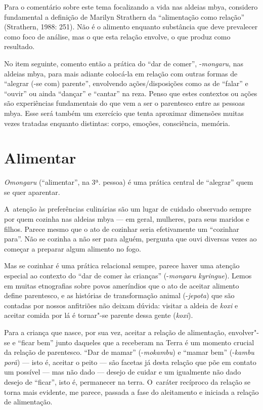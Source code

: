 Para o comentário sobre este tema focalizando a vida nas aldeias mbya,
considero fundamental a definição de Marilyn Strathern da ``alimentação
como relação'' (Strathern, 1988: 251). Não é o alimento enquanto
substância que deve prevalecer como foco de análise, mas o que esta
relação envolve, o que produz como resultado.

No item seguinte, comento então a prática do ``dar de comer'', -\emph{mongaru},
nas aldeias mbya, para mais adiante colocá-la em relação com outras
formas de ``alegrar (-se com) parente'', envolvendo ações/disposições
como as de ``falar'' e ``ouvir'' ou ainda ``dançar'' e ``cantar'' na reza. Penso que
estes contextos ou ações são experiências fundamentais do que vem a ser
o parentesco entre as pessoas mbya. Esse será também um exercício que
tenta aproximar dimensões muitas vezes tratadas enquanto distintas:
corpo, emoções, consciência, memória.

\section{Alimentar}

\emph{Omongaru} (``alimentar'', na 3ª. pessoa) é uma prática central de ``alegrar''
quem se quer aparentar.

A~atenção às preferências culinárias são um lugar de cuidado observado
sempre por quem cozinha nas aldeias mbya --- em geral, mulheres, para
seus maridos e filhos. Parece mesmo que o ato de cozinhar seria
efetivamente um ``cozinhar para''. Não se cozinha a não ser para alguém,
pergunta que ouvi diversas vezes ao começar a preparar algum alimento
no fogo. 

Mas se cozinhar é uma prática relacional sempre, parece haver uma
atenção especial ao contexto do ``dar de comer às crianças'' (-\emph{mongaru
kyringue}). Lemos em muitas etnografias sobre povos ameríndios que o ato
de aceitar alimento define parentesco, e as histórias de transformação
animal (-\emph{jepota}) que são contadas por nossos anfitriões não deixam
dúvida: visitar a aldeia de \emph{koxi} e aceitar comida por lá é tornar"-se
parente dessa gente (\emph{koxi}).

Para a criança que nasce, por sua vez, aceitar a relação de alimentação,
envolver"-se e ``ficar bem'' junto daqueles que a receberam na Terra é um
momento crucial da relação de parentesco. ``Dar de mamar'' (-\emph{mokambu}) e
``mamar bem'' (-\emph{kambu porã}) --- isto é, aceitar o peito --- são facetas já
desta relação que põe em contato um possível --- mas não dado --- desejo de
cuidar e um igualmente não dado desejo de ``ficar'', isto é, permanecer na
terra. O~caráter recíproco da relação se torna mais evidente, me
parece, passada a fase do aleitamento e iniciada a relação de
alimentação.

